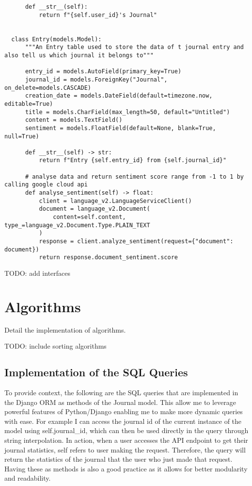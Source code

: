 \begin{verbatim}
      def __str__(self):
          return f"{self.user_id}'s Journal"
  
  
  class Entry(models.Model):
      """An Entry table used to store the data of t journal entry and also tell us which journal it belongs to"""
  
      entry_id = models.AutoField(primary_key=True)
      journal_id = models.ForeignKey("Journal", on_delete=models.CASCADE)
      creation_date = models.DateField(default=timezone.now, editable=True)
      title = models.CharField(max_length=50, default="Untitled")
      content = models.TextField()
      sentiment = models.FloatField(default=None, blank=True, null=True)
  
      def __str__(self) -> str:
          return f"Entry {self.entry_id} from {self.journal_id}"
  
      # analyse data and return sentiment score range from -1 to 1 by calling google cloud api
      def analyse_sentiment(self) -> float:
          client = language_v2.LanguageServiceClient()
          document = language_v2.Document(
              content=self.content, type_=language_v2.Document.Type.PLAIN_TEXT
          )
          response = client.analyze_sentiment(request={"document": document})
          return response.document_sentiment.score
\end{verbatim}
TODO: add interfaces 


\section{Algorithms}
Detail the implementation of algorithms.

TODO: include sorting algorithms

\subsection{Implementation of the SQL Queries}
To provide context, the following are the SQL queries that are implemented in the Django ORM as methods of the Journal model. This allow me to leverage powerful features of Python/Django enabling me to make more dynamic queries with ease. For example I can access the journal id of the current instance of the model using self.journal\_id, which can then be used directly in the query through string interpolation. In action, when a user accesses the API endpoint to get their journal statistics, self refers to user making the request. Therefore, the query will return the statistics of the journal that the user who just made that request. Having these as methods is also a good practice as it allows for better modularity and readability.


